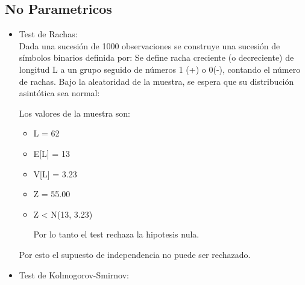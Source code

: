 \documentclass[letter, 10pt]{article}
\begin{document}
\subsection{No Parametricos}
\begin{itemize}
\item Test de Rachas:
\\
Dada una sucesi\'on de 1000 observaciones se construye una sucesi\'on de s\'imbolos binarios definida por:
Se define racha creciente (o decreciente)  de longitud L a un grupo seguido de n\'umeros 1 (+) o 0(-), contando el n\'umero de rachas. Bajo la aleatoridad de la muestra, se espera  que su distribuci\'on  asint\'otica sea normal:

Los valores de la muestra son:
\begin{itemize}
\item L = 62
\item E[L] = 13
\item V[L] = 3.23
\item Z = 55.00 
\item Z < N(13, 3.23)

Por lo tanto el test rechaza la hipotesis nula.

\end{itemize}
Por esto el supuesto de independencia no puede ser rechazado.
\item Test de Kolmogorov-Smirnov:
\\
 

\end{itemize}
\end{document}
